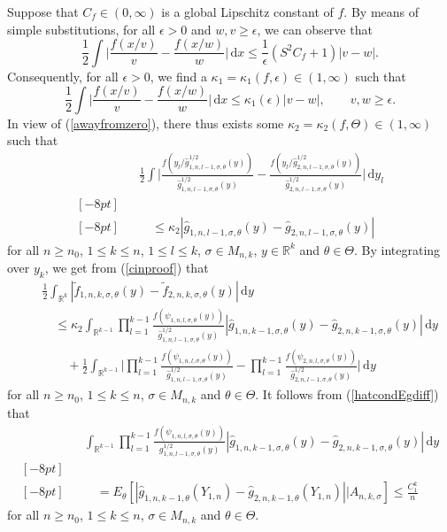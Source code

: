 \documentclass[number,citesort,seceqn,dvips]{arxbj}
\newcommand{\eqref}[1]{(\ref{#1})}
\newcommand{\RR}{\mathbb{R}}
\begin{document}
\begin{pf}
Suppose that $C_f\in(0,\infty)$ is a
global Lipschitz constant of $f$. By means of simple substitutions, for
all $\epsilon>0$ and $w, v\ge\epsilon$, we can observe that
%
\[
\frac
12 \int \biggl|\frac{f(x/v)}{v}-\frac{f(x/w)}{w} \biggr|\,\mathrm{d}x \le
\frac1
\epsilon (S^2 C_f+1) |v-w| .
\]
%
Consequently, for all $\epsilon>0$,
we find a $\kappa_1=\kappa_1(f,\epsilon)\in(1,\infty)$ such that
%
\[
\frac12
\int \biggl|\frac{f(x/v)}{v}-\frac{f(x/w)}{w} \biggr|\,\mathrm{d}x \le
\kappa_1(\epsilon)|v-w|,\qquad  v,w\ge\epsilon .
\]
%
In view of
\eqref{awayfromzero}, there thus exists some
$\kappa_2=\kappa_2(f,\Theta)\in(1,\infty)$ such that
%
\begin{eqnarray}\label{cinproof}
&&\frac12 \int \biggl|\frac{f(y_l/\hat
g^{1/2}_{1,n,l - 1,\sigma,\theta}(y))}{\hat
g_{1,n,l - 1,\sigma,\theta}^{1/2}(y)}- \frac{f(y_l/\hat
g^{1/2}_{2,n,l - 1,\sigma,\theta}(y))}{\hat
g^{1/2}_{2,n,l - 1,\sigma,\theta}(y)} \biggr|\,\mathrm{d}y_l\nonumber\\ [-8pt]\\ [-8pt]
&&\quad\le\kappa_2|\hat g_{1,n,{l - 1},\sigma,\theta}(y)-\hat
g_{2,n,l - 1,\sigma,\theta}(y)|\nonumber
\end{eqnarray}
%
for all $n\ge n_0$,
$1 \le  k \le  n$, $1 \le  l\le  k$, $\sigma\in M_{n,k}$,
$y\in\RR^{k}$ and $\theta\in\Theta$. By integrating over $y_k$, we get
from \eqref{cinproof} that
%
\begin{eqnarray}\label{cinproof2}
&&\frac12\int_{\RR^k}|\tilde f_{1,n,k,\sigma,\theta}(y)-\tilde
f_{2,n,k,\sigma,\theta}(y)|\,\mathrm{d}y\nonumber\\
&&\quad\le \kappa_2\int_{\RR^{k - 1}}\prod_{l=1}^{k-1}
\frac{f(\psi_{1,n,l,\sigma,\theta}(y))}{\hat
g^{1/2}_{1,n,l - 1,\sigma,\theta}(y)}  |\hat
g_{1,n,k - 1,\sigma,\theta}(y)-
\hat g_{2,n,k - 1,\sigma,\theta}(y) |\,\mathrm{d}y\\
&&\qquad{} +\frac12\int_{\RR^{k - 1}} \Biggl|\prod_{l=1}^{k-1}
\frac{f(\psi_{1,n,l,\sigma,\theta}(y))}{\hat
g^{1/2}_{1,n,l - 1,\sigma,\theta}(y)}- \prod_{l=1}^{k-1}
\frac{f(\psi_{2,n,l,\sigma,\theta}(y))}{\hat
g^{1/2}_{2,n,l - 1,\sigma,\theta}(y)} \Biggr|\,\mathrm{d}y\nonumber
\end{eqnarray}
%
for all $n\ge n_0$, $1 \le  k \le  n$, $\sigma\in M_{n,k}$ and
$\theta\in\Theta$. It follows from \eqref{hatcondEgdiff} that
%
\begin{eqnarray}\label{cinproof3}
&& \int_{\RR^{k - 1}}\prod_{l=1}^{k-1}
\frac{f(\psi_{1,n,l,\sigma,\theta}(y))}{g^{1/2}_{1,n,l - 1,\sigma
,\theta}(y)}
 |\hat g_{1,n,k - 1,\sigma,\theta}(y)- \hat g_{2,n,k -
1,\sigma,\theta}(y) |\,\mathrm{d}y\nonumber\\ [-8pt]\\ [-8pt]
&&\quad=E_\theta [  |\hat g_{1,n,k - 1,\theta}(Y_{1,n})-
\hat g_{2,n,k - 1,\theta}(Y_{1,n}) | |A_{n,k,\sigma}]\le
\frac{C_1^k}n\nonumber
\end{eqnarray}
%
for all $n\ge n_0$, $1 \le  k \le  n$, $\sigma\in M_{n,k}$ and
$\theta\in\Theta$.


\end{pf}
\end{document}
